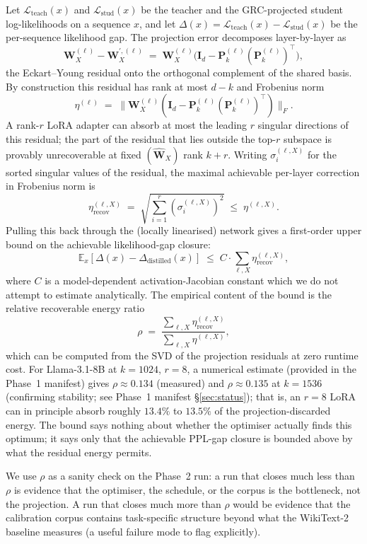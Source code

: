 \documentclass[11pt]{article}
\providecommand{\Imat}{\mathbf{I}}
\providecommand{\Pmat}{\mathbf{P}}
\providecommand{\Wmat}{\mathbf{W}}
\begin{document}
Let $\mathcal{L}_{\text{teach}}(x)$ and $\mathcal{L}_{\text{stud}}(x)$
be the teacher and the GRC-projected student log-likelihoods on a
sequence $x$, and let $\Delta(x) = \mathcal{L}_{\text{teach}}(x) -
\mathcal{L}_{\text{stud}}(x)$ be the per-sequence likelihood gap. The
projection error decomposes layer-by-layer as
\[
\Wmat_X^{(\ell)} - \Wmat_X^{\prime,(\ell)}
\;=\; \Wmat_X^{(\ell)} \big(\Imat_d - \Pmat_k^{(\ell)} (\Pmat_k^{(\ell)})^\top\big),
\]
the Eckart--Young residual onto the orthogonal complement of the
shared basis. By construction this residual has rank at most
$d - k$ and Frobenius norm
\[
\eta^{(\ell)} \;=\; \big\|\Wmat_X^{(\ell)}(\Imat_d - \Pmat_k^{(\ell)}(\Pmat_k^{(\ell)})^\top)\big\|_F.
\]
A rank-$r$ LoRA adapter can absorb at most the leading $r$ singular
directions of this residual; the part of the residual that lies outside
the top-$r$ subspace is provably unrecoverable at fixed
$(\hat{\Wmat}_X)$ rank $k+r$. Writing $\sigma_i^{(\ell,X)}$ for the
sorted singular values of the residual, the maximal achievable per-layer
correction in Frobenius norm is
\[
\eta_{\text{recov}}^{(\ell,X)} \;=\; \sqrt{\sum_{i=1}^{r} (\sigma_i^{(\ell,X)})^2}
\;\le\; \eta^{(\ell,X)}.
\]
Pulling this back through the (locally linearised) network gives a
first-order upper bound on the achievable likelihood-gap closure:
\[
\mathbb{E}_x[\Delta(x) - \Delta_{\text{distilled}}(x)]
\;\le\; C \cdot \sum_{\ell,X} \eta_{\text{recov}}^{(\ell,X)},
\]
where $C$ is a model-dependent activation-Jacobian constant which we
do not attempt to estimate analytically. The empirical content of the
bound is the relative recoverable energy ratio
\[
\rho \;=\; \frac{\sum_{\ell,X} \eta_{\text{recov}}^{(\ell,X)}}{\sum_{\ell,X} \eta^{(\ell,X)}},
\]
which can be computed from the SVD of the projection residuals at zero
runtime cost. For Llama-3.1-8B at $k{=}1024$, $r{=}8$, a numerical
estimate (provided in the Phase~1 manifest) gives $\rho \approx 0.134$
(measured) and $\rho \approx 0.135$ at $k{=}1536$ (confirming stability;
see Phase~1 manifest \S\ref{sec:status}); that is, an $r{=}8$ LoRA can
in principle absorb roughly $13.4\%$ to $13.5\%$ of the
projection-discarded energy. The bound says nothing about whether the
optimiser actually finds this optimum; it says only that the achievable
PPL-gap closure is bounded above by what the residual energy permits.

We use $\rho$ as a sanity check on the Phase~2 run: a run that closes
much less than $\rho$ is evidence that the optimiser, the schedule, or
the corpus is the bottleneck, not the projection. A run that closes
much more than $\rho$ would be evidence that the calibration corpus
contains task-specific structure beyond what the WikiText-2 baseline
measures (a useful failure mode to flag explicitly).
\end{document}

